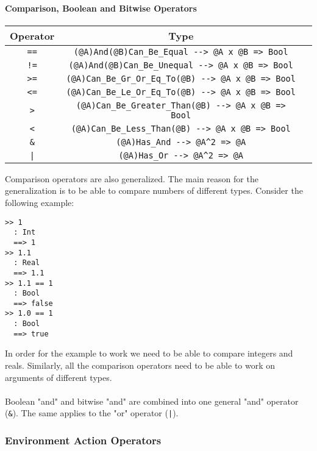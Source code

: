 \documentclass{article}
\begin{document}
\paragraph{Comparison, Boolean and Bitwise Operators}

\begin{center}
\begin{tabular}{ |c|c|c| } 
\hline
Operator & Type
\\ 
\hline
\hline
\verb|==| & \verb|(@A)And(@B)Can_Be_Equal --> @A x @B => Bool|
\\
\hline
\verb|!=| & \verb|(@A)And(@B)Can_Be_Unequal --> @A x @B => Bool|
\\
\hline
\verb|>=| & \verb|(@A)Can_Be_Gr_Or_Eq_To(@B) --> @A x @B => Bool|
\\
\hline
\verb|<=| & \verb|(@A)Can_Be_Le_Or_Eq_To(@B) --> @A x @B => Bool|
\\
\hline
\verb|>| & \verb|(@A)Can_Be_Greater_Than(@B) --> @A x @B => Bool|
\\
\hline
\verb|<| & \verb|(@A)Can_Be_Less_Than(@B) --> @A x @B => Bool|
\\
\hline
\verb|&| & \verb|(@A)Has_And --> @A^2 => @A|
\\
\hline
\texttt{|} & \verb|(@A)Has_Or --> @A^2 => @A|
\\
\hline
\end{tabular}
\end{center}
Comparison operators are also generalized. The main reason for the
generalization is to be able to compare numbers of different types. Consider
the following example:

\begin{verbatim}
>> 1
  : Int
  ==> 1
>> 1.1
  : Real
  ==> 1.1
>> 1.1 == 1
  : Bool
  ==> false
>> 1.0 == 1
  : Bool
  ==> true
\end{verbatim}
In order for the example to work we need to be able to compare integers and
reals.  Similarly, all the comparison operators need to be able to work on
arguments of different types.
\\\\
Boolean "and" and bitwise "and" are combined into one general "and" operator
(\verb|&|). The same applies to the "or" operator (\texttt{|}).

\newpage

\subsubsection{Environment Action Operators}
\label{subsec:envacts}
\end{document}
